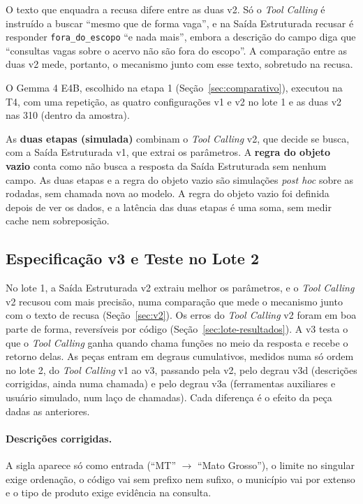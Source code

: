 O texto que enquadra a recusa difere entre as duas v2. Só o \textit{Tool Calling} é instruído a buscar ``mesmo que de forma vaga'', e na Saída Estruturada recusar é responder \texttt{fora\_do\_escopo} ``e nada mais'', embora a descrição do campo diga que ``consultas vagas sobre o acervo não são fora do escopo''. A comparação entre as duas v2 mede, portanto, o mecanismo junto com esse texto, sobretudo na recusa.

O Gemma 4 E4B, escolhido na etapa 1 (Seção~\ref{sec:comparativo}), executou na T4, com uma repetição, as quatro configurações v1 e v2 no lote 1 e as duas v2 nas 310 (dentro da amostra).

As \textbf{duas etapas (simulada)} combinam o \textit{Tool Calling} v2, que decide se busca, com a Saída Estruturada v1, que extrai os parâmetros. A \textbf{regra do objeto vazio} conta como não busca a resposta da Saída Estruturada sem nenhum campo. As duas etapas e a regra do objeto vazio são simulações \textit{post hoc} sobre as rodadas, sem chamada nova ao modelo. A regra do objeto vazio foi definida depois de ver os dados, e a latência das duas etapas é uma soma, sem medir cache nem sobreposição.

\subsection{Especificação v3 e Teste no Lote 2}
\label{sec:v3}

No lote 1, a Saída Estruturada v2 extraiu melhor os parâmetros, e o \textit{Tool Calling} v2 recusou com mais precisão, numa comparação que mede o mecanismo junto com o texto de recusa (Seção~\ref{sec:v2}). Os erros do \textit{Tool Calling} v2 foram em boa parte de forma, reversíveis por código (Seção~\ref{sec:lote-resultados}). A v3 testa o que o \textit{Tool Calling} ganha quando chama funções no meio da resposta e recebe o retorno delas. As peças entram em degraus cumulativos, medidos numa só ordem no lote 2, do \textit{Tool Calling} v1 ao v3, passando pela v2, pelo degrau v3d (descrições corrigidas, ainda numa chamada) e pelo degrau v3a (ferramentas auxiliares e usuário simulado, num laço de chamadas). Cada diferença é o efeito da peça dadas as anteriores.

\paragraph{Descrições corrigidas.} A sigla aparece só como entrada (``MT'' $\rightarrow$ ``Mato Grosso''), o limite no singular exige ordenação, o código vai sem prefixo nem sufixo, o município vai por extenso e o tipo de produto exige evidência na consulta.

